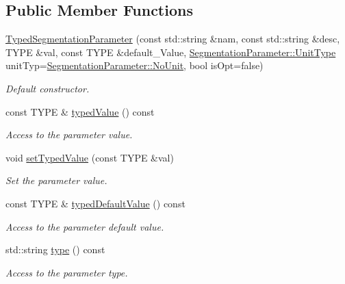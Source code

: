 \subsection*{Public Member Functions}
\begin{DoxyCompactItemize}
\item 
\hyperlink{class_d_d4hep_1_1_d_d_segmentation_1_1_typed_segmentation_parameter_a59c2507c03ce750d64a5800bdc0f531b}{Typed\+Segmentation\+Parameter} (const std\+::string \&nam, const std\+::string \&desc, T\+Y\+PE \&val, const T\+Y\+PE \&default\+\_\+\+Value, \hyperlink{class_d_d4hep_1_1_d_d_segmentation_1_1_segmentation_parameter_a36f5f8b8d812b2a2b81363377565d8d4}{Segmentation\+Parameter\+::\+Unit\+Type} unit\+Typ=\hyperlink{class_d_d4hep_1_1_d_d_segmentation_1_1_segmentation_parameter_a36f5f8b8d812b2a2b81363377565d8d4ab217a538e0ac077135786260a2221c14}{Segmentation\+Parameter\+::\+No\+Unit}, bool is\+Opt=false)
\begin{DoxyCompactList}\small\item\em Default constructor. \end{DoxyCompactList}\item 
const T\+Y\+PE \& \hyperlink{class_d_d4hep_1_1_d_d_segmentation_1_1_typed_segmentation_parameter_a2fccafb9e339bc5e1f48b7e1d2d7da1a}{typed\+Value} () const
\begin{DoxyCompactList}\small\item\em Access to the parameter value. \end{DoxyCompactList}\item 
void \hyperlink{class_d_d4hep_1_1_d_d_segmentation_1_1_typed_segmentation_parameter_a53509da19e4377e01d2fdb685f94778a}{set\+Typed\+Value} (const T\+Y\+PE \&val)
\begin{DoxyCompactList}\small\item\em Set the parameter value. \end{DoxyCompactList}\item 
const T\+Y\+PE \& \hyperlink{class_d_d4hep_1_1_d_d_segmentation_1_1_typed_segmentation_parameter_a2cec07ab827bef9e7b40a8cfc18d9617}{typed\+Default\+Value} () const
\begin{DoxyCompactList}\small\item\em Access to the parameter default value. \end{DoxyCompactList}\item 
std\+::string \hyperlink{class_d_d4hep_1_1_d_d_segmentation_1_1_typed_segmentation_parameter_a94048e5faa76978155f30389ed541bd9}{type} () const
\begin{DoxyCompactList}\small\item\em Access to the parameter type. \end{DoxyCompactList}\item 

\end{DoxyCompactItemize}
